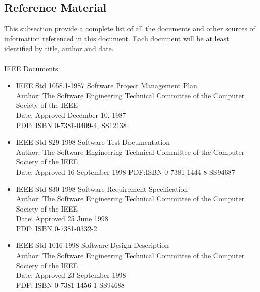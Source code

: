 \documentclass[12pt]{article}
\begin{document}
\subsection{Reference Material}
This subsection provide a complete list of all the documents and other sources of information referenced in this document. Each document will be at least identified by title, author and date.\\\\
IEEE Documents:
\begin{itemize}
  \item IEEE Std 1058.1-1987  Software Project Management Plan\\
				Author: The Software Engineering Technical Committee of the Computer Society of the IEEE\\
                Date: Approved December 10, 1987\\
				PDF: ISBN 0-7381-0409-4, SS12138

  \item IEEE Std 829-1998  Software Test Documentation\\
				Author: The Software Engineering Technical Committee of the Computer Society of the IEEE\\
                Date: Approved 16 September 1998
				PDF:ISBN 0-7381-1444-8 SS94687

  \item IEEE Std 830-1998 Software Requirement Specification \\
				Author: The Software Engineering Technical Committee of the Computer Society of the IEEE \\
                Date: Approved 25 June 1998\\
				PDF: ISBN 0-7381-0332-2

  \item IEEE Std 1016-1998 Software Design Description\\
				Author: The Software Engineering Technical Committee of the Computer Society of the IEEE\\
                Date: Approved 23 September 1998\\
				PDF: ISBN 0-7381-1456-1 SS94688	
\end{itemize}
\end{document}
